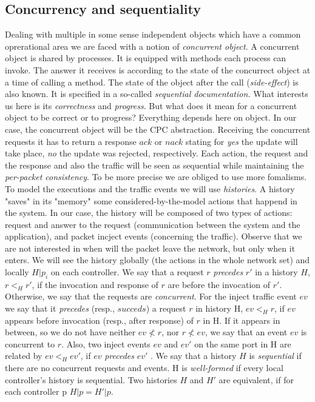 \documentclass{article}
\theoremstyle{remark}
\begin{document}
\subsection{Concurrency and sequentiality}
Dealing with multiple in some sense independent objects which have a common oprerational area we are faced with a notion of \emph{concurrent object}. A concurrent object is shared by processes. It is equipped with methods each process can invoke. The answer it receives is according to the state of the concurrect object at a time of calling a method. The state of the object after the call (\emph{side-effect}) is also known. It is specified in a so-called \emph{sequential documentation.} What interests us here is its \emph{correctness} and \emph{progress}. But what does it mean for a concurrent object to be correct or to progress? Everything depends here on object.
In our case, the concurrent object will be the CPC abstraction. Receiving the concurrent requests it has to return a response $ack$ or $nack$ stating for \emph{yes} the update will take place, \emph{no} the update was rejected, respectively. Each action, the request and the response and also the traffic will be seen as sequential while maintaining the \emph{per-packet consistency}.
To be more precise we are obliged to use more fomalisms.
To model the executions and the traffic events we will use \emph{histories}. A history "saves" in its "memory" some considered-by-the-model actions that happend in the system. In our case, the history will be composed of two types of actions: request and  answer to the request (communication between the system and the application), and packet incject events (concerning the traffic). Observe that we are not interested in when will the packet leave the network, but only when it enters.
We will see the history globally (the actions in the whole network set) and locally $H|p_i$ on each controller.
We say that a request $r$ \emph{precedes} $r'$ in a history $H$, $r<_Hr'$, if the invocation and response of $r$ are before the invocation of $r'$. Otherwise, we say that the requests are \emph{concurrent}. For the inject traffic event $ev$ we say that it \emph{precedes} (resp., $succeds$) a request $r$ in history H, $ev<_H r$, if $ev$ appears before invocation (resp., after response)  of $r$ in H. If it appears in between, so we do not have neither $ev\nless r$, nor $r\nless ev$, we say that an event $ev$ is concurrent to $r$. Also, two inject events $ev$ and $ev'$ on the same port in H are related by $ev<_Hev'$, if $ev$ \emph{precedes} $ev'$ \cite{CKLS15}.
We say that a history $H$ is \emph{sequential} if there are no concurrent requests and events. H is \emph{well-formed} if every local controller's history is sequential. Two histories $H$ and $H'$ are equivalent, if for each controller p $H|p = H'|p$. 
\end{document}
